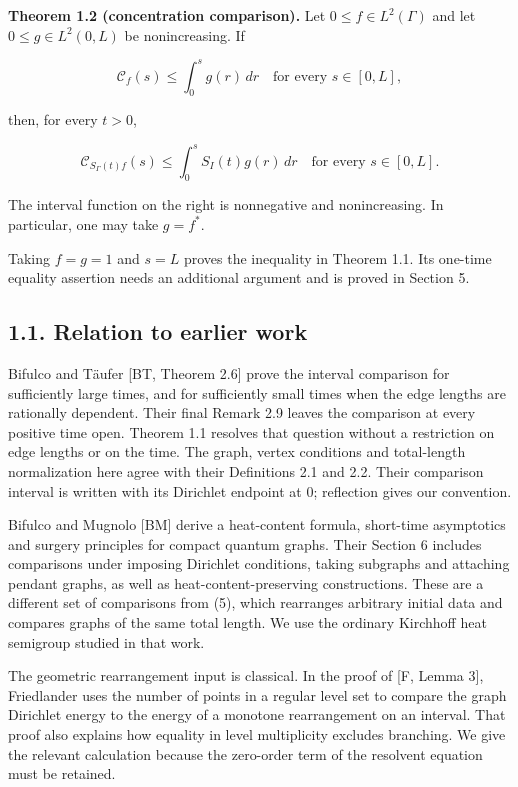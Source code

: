 \documentclass[11pt]{article}
\begin{document}
\textbf{Theorem 1.2 (concentration comparison).} Let
\(0\le f\in L^2(\Gamma)\) and let \(0\le g\in L^2(0,L)\) be
nonincreasing. If

\[
\mathcal C_f(s)\le\int_0^s g(r)\,dr
\quad\text{for every }s\in[0,L],
\tag{4}
\]

then, for every \(t>0\),

\[
\mathcal C_{S_\Gamma(t)f}(s)
\le\int_0^s S_I(t)g(r)\,dr
\quad\text{for every }s\in[0,L].
\tag{5}
\]

The interval function on the right is nonnegative and nonincreasing. In
particular, one may take \(g=f^*\).

Taking \(f=g=1\) and \(s=L\) proves the inequality in Theorem 1.1. Its
one-time equality assertion needs an additional argument and is proved
in Section 5.

\subsection{1.1. Relation to earlier
work}\label{relation-to-earlier-work}

Bifulco and Täufer {[}BT, Theorem 2.6{]} prove the interval comparison
for sufficiently large times, and for sufficiently small times when the
edge lengths are rationally dependent. Their final Remark 2.9 leaves the
comparison at every positive time open. Theorem 1.1 resolves that
question without a restriction on edge lengths or on the time. The
graph, vertex conditions and total-length normalization here agree with
their Definitions 2.1 and 2.2. Their comparison interval is written with
its Dirichlet endpoint at \(0\); reflection gives our convention.

Bifulco and Mugnolo {[}BM{]} derive a heat-content formula, short-time
asymptotics and surgery principles for compact quantum graphs. Their
Section 6 includes comparisons under imposing Dirichlet conditions,
taking subgraphs and attaching pendant graphs, as well as
heat-content-preserving constructions. These are a different set of
comparisons from (5), which rearranges arbitrary initial data and
compares graphs of the same total length. We use the ordinary Kirchhoff
heat semigroup studied in that work.

The geometric rearrangement input is classical. In the proof of {[}F,
Lemma 3{]}, Friedlander uses the number of points in a regular level set
to compare the graph Dirichlet energy to the energy of a monotone
rearrangement on an interval. That proof also explains how equality in
level multiplicity excludes branching. We give the relevant calculation
because the zero-order term of the resolvent equation must be retained.
\end{document}
